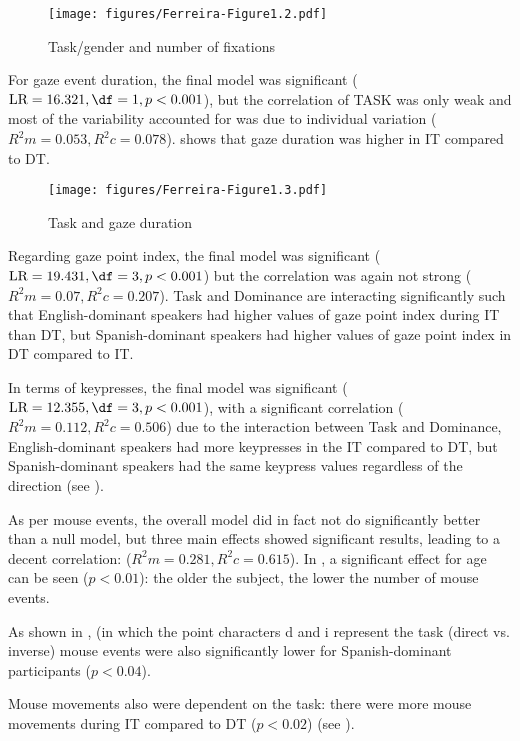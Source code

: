 \documentclass[output=paper]{langscibook}
\begin{document}
\begin{figure}
        \texttt{[image: figures/Ferreira-Figure1.2.pdf]}
        \caption{Task/gender and number of fixations\label{fig2h}}
\end{figure}

For gaze event duration, the final model was significant ($\text{LR} = 16.321, \df = 1, p < 0.001$), but the correlation of TASK was only weak and most of the variability accounted for was due to individual variation ($R^2m = 0.053, R^2c = 0.078$).  shows that gaze duration was higher in IT compared to DT. 

\begin{figure}
        \texttt{[image: figures/Ferreira-Figure1.3.pdf]}
        \caption{Task and gaze duration\label{fig3h}}
\end{figure}

Regarding gaze point index, the final model was significant ($\text{LR} = 19.431, \df = 3, p < 0.001$) but the correlation was again not strong ($R^2m = 0.07, R^2c = 0.207$). Task and Dominance are interacting significantly such that English-dominant speakers had higher values of gaze point index during IT than DT, but Spanish-dominant speakers had higher values of gaze point index in DT compared to IT. 

In terms of keypresses, the final model was significant ($\text{LR} = 12.355, \df = 3, p < 0.001$), with a significant correlation ($R^2m = 0.112, R^2c = 0.506$) due to the interaction between Task and Dominance, English-dominant speakers had more keypresses in the IT compared to DT, but Spanish-dominant speakers had the same keypress values regardless of the direction (see ).

As per mouse events, the overall model did in fact not do significantly better than a null model, but three main effects showed significant results, leading to a decent correlation: ($R^2m = 0.281, R^2c = 0.615$). In , a significant effect for age can be seen ($p < 0.01$): the older the subject, the lower the number of mouse events.

As shown in , (in which the point characters d and i represent the task (direct vs. inverse) mouse events were also significantly lower for Spanish-dominant participants ($p < 0.04$). 

Mouse movements also were dependent on the task: there were more mouse movements during IT compared to DT ($p < 0.02$) (see ).
\end{document}
